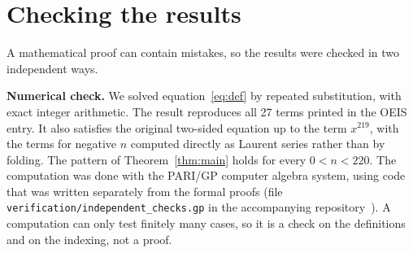 \documentclass[11pt,a4paper]{article}
\theoremstyle{definition}
\theoremstyle{remark}
\newcommand{\para}[1]{\par\medskip\noindent\textbf{#1}\enspace}
\begin{document}
\section{Checking the results}\label{sec:checks}

A mathematical proof can contain mistakes, so the results were checked in two independent ways.

\para{Numerical check.}
We solved equation~\eqref{eq:def} by repeated substitution, with exact integer arithmetic. The result reproduces all
27 terms printed in the OEIS entry. It also satisfies the original two-sided equation up to the term $x^{219}$, with
the terms for negative $n$ computed directly as Laurent series rather than by folding. The pattern of
Theorem~\ref{thm:main} holds for every $0<n<220$.
The computation was done with the PARI/GP computer algebra system, using code that was written separately from the
formal proofs (file \texttt{verification/independent\_checks.gp} in the accompanying repository~\cite{repo}).
A computation can only test finitely many cases, so it is a check on the definitions and on the indexing, not a proof.
\end{document}
